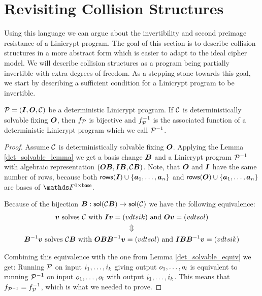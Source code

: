 \section{Revisiting Collision Structures}

Using this language we can argue about the invertibility and second preimage resistance of a Linicrypt program.
The goal of this section is to describe collision structures in a more abstract form 
which is easier to adapt to the ideal cipher model.
We will describe collision structures as a program being partially invertible with extra degrees of freedom.
As a stepping stone towards this goal, we start by describing a sufficient condition for a Linicrypt program to be invertible.

\begin{lemma}
\label{inversion}
    $\P = (\I, \O, \C)$ be a deterministic Linicrypt program.
    If $\C$ is deterministically solvable fixing $\O$,
    then $f_\P$ is bijective and $f_\P^{-1}$ is the associated function of a deterministic Linicrypt program which we call $\P^{-1}$.
\end{lemma}

\begin{proof}
Assume $\C$ is deterministically solvable fixing $\O$.
Applying the Lemma \ref{det_solvable_lemma} we get a basis change $\B$
and a Linicrypt program $\P^{-1}$ with algebraic representation $(\O \B, \I \B, \C \B)$.
Note, that $\O$ and $\I$ have the same number of rows, because both $\rows(\I) \cup \{\dts \va n\}$ and
$\rows(\O) \cup \{\dts \va n\}$ are bases of $\F^{1\times\base}$.

Because of the bijection $\B: \sol(\C\B) \to \sol(\C)$ we have the following equivalence:
\begin{gather*}
    \vv \textrm{ solves } \C \textrm{ with }
    \I \vv = \vec i k \textrm{ and } \O \vv = \vec o l \\
    \Updownarrow \\
    \B^{-1} \vv \textrm{ solves } \C \B \textrm{ with }
    \O \B \B^{-1} \vv = \vec o l  \textrm{ and }\I \B \B^{-1} \vv = \vec i k  
\end{gather*}

Combining this equivalence with the one from Lemma \ref{det_solvable_equiv} we get:
Running $\P$ on input $\dts i k$ giving output $\dts o l$ is equivalent to running 
$\P^{-1}$ on input $\dts o l$ with output $\dts i k$.
This means that $f_{\P^{-1}} = f_\P^{-1}$, which is what we needed to prove.
\end{proof}

